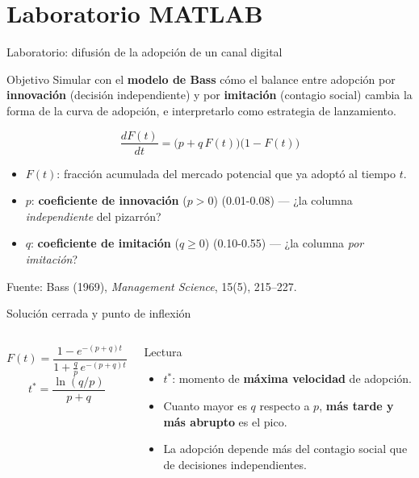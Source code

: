 \documentclass[aspectratio=169,xcolor=dvipsnames]{beamer}
\newcommand{\fuente}[1]{{\tiny\color{IPNgris}Fuente: #1}}
\begin{document}
\section[Laboratorio]{Laboratorio MATLAB}

\begin{frame}{Laboratorio: difusión de la adopción de un canal digital}
\begin{block}{Objetivo}
  Simular con el \textbf{modelo de Bass} cómo el balance entre adopción por \textbf{innovación} (decisión independiente) y por \textbf{imitación} (contagio social) cambia la forma de la curva de adopción, e interpretarlo como estrategia de lanzamiento.
\end{block}
\begin{equation}
  \frac{dF(t)}{dt} = \big(p + q\,F(t)\big)\big(1 - F(t)\big)
\end{equation}
\begin{itemize}
  \small
  \item $F(t)$: fracción acumulada del mercado potencial que ya adoptó al tiempo $t$.
  \item $p$: \textbf{coeficiente de innovación} ($p>0$) (0.01-0.08) — ¿la columna \emph{independiente} del pizarrón?
  \item $q$: \textbf{coeficiente de imitación} ($q\geq 0$) (0.10-0.55) — ¿la columna \emph{por imitación}?
\end{itemize}
\fuente{Bass (1969), \textit{Management Science}, 15(5), 215--227.}
\end{frame}

\begin{frame}{Solución cerrada y punto de inflexión}
\begin{columns}[c]
  \begin{equation}
    F(t) = \frac{1 - e^{-(p+q)t}}{1 + \tfrac{q}{p}\,e^{-(p+q)t}}
  \end{equation}
  \begin{equation}
    t^\ast = \frac{\ln(q/p)}{p+q}
  \end{equation}
  \begin{block}{Lectura}
    \small
    \begin{itemize}
      \item $t^\ast$: momento de \textbf{máxima velocidad} de adopción.
      \item Cuanto mayor es $q$ respecto a $p$, \textbf{más tarde y más abrupto} es el pico.
      \item La adopción depende más del contagio social que de decisiones independientes.
    \end{itemize}
  \end{block}
\end{columns}
\end{frame}
\end{document}
